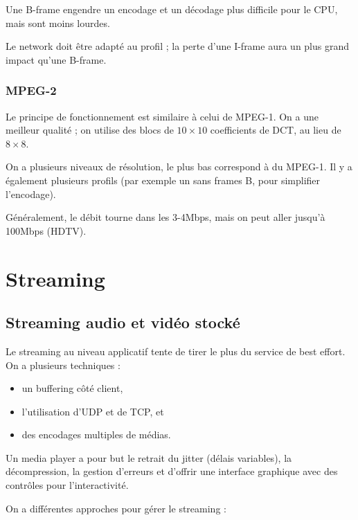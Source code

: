			Une B-frame engendre un encodage et un décodage plus difficile pour le CPU, mais sont moins lourdes.
		
			Le network doit être adapté au profil ; la perte d'une I-frame aura un plus grand impact qu'une B-frame.
		
			\subsubsection{MPEG-2}
			
			Le principe de fonctionnement est similaire à celui de MPEG-1. On a une meilleur qualité ; on utilise des blocs de $10 \times 10$ coefficients de DCT, au lieu de $8 \times 8$.
			
			On a plusieurs niveaux de résolution, le plus bas correspond à du MPEG-1. Il y a également plusieurs profils (par exemple un sans frames B, pour simplifier l'encodage).
			
			Généralement, le débit tourne dans les 3-4Mbps, mais on peut aller jusqu'à 100Mbps (HDTV).
		
	
	\section{Streaming}			
		\subsection{Streaming audio et vidéo stocké}
		
		Le streaming au niveau applicatif tente de tirer le plus du service de best effort. On a plusieurs techniques :
		
		\begin{itemize}
			\item un buffering côté client,
			\item l'utilisation d'UDP et de TCP, et
			\item des encodages multiples de médias.
		\end{itemize}
		
		Un media player a pour but le retrait du jitter (délais variables), la décompression, la gestion d'erreurs et d'offrir une interface graphique avec des contrôles pour l'interactivité.
		
		On a différentes approches pour gérer le streaming :
		
